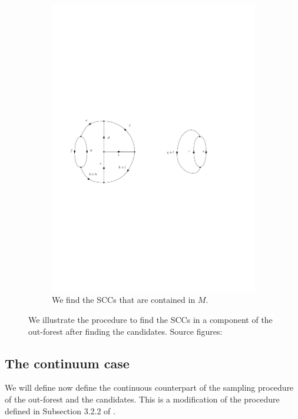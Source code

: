 \begin{figure}
\begin{subfigure}{.8\textwidth}
  \includegraphics[width=0.9\linewidth]{Content/Pictures/cutting.pdf}
  \caption{We find the SCCs that are contained in $M$.}
  \label{figure.extractSCCs3}
\end{subfigure}

\caption{We illustrate the procedure to find the SCCs in a component of the out-forest after finding the candidates. Source figures: \cite{goldschmidtScalingLimitCritical2019}}
\end{figure}

\subsection{The continuum case}\label{subsec.limitobject}

We will define now define the continuous counterpart of the sampling procedure of the out-forest and the candidates. This is a modification of the procedure defined in Subsection 3.2.2 of \cite{goldschmidtScalingLimitCritical2019}. \\

